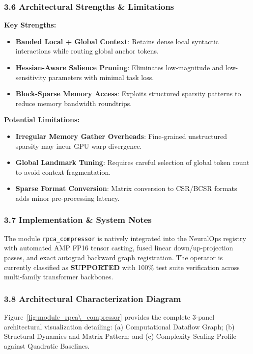 \subsubsection*{3.6 Architectural Strengths \& Limitations}
\textbf{Key Strengths:}
\begin{itemize}
    \item \textbf{Banded Local + Global Context}: Retains dense local syntactic interactions while routing global anchor tokens.
    \item \textbf{Hessian-Aware Salience Pruning}: Eliminates low-magnitude and low-sensitivity parameters with minimal task loss.
    \item \textbf{Block-Sparse Memory Access}: Exploits structured sparsity patterns to reduce memory bandwidth roundtrips.
\end{itemize}

\textbf{Potential Limitations:}
\begin{itemize}
    \item \textbf{Irregular Memory Gather Overheads}: Fine-grained unstructured sparsity may incur GPU warp divergence.
    \item \textbf{Global Landmark Tuning}: Requires careful selection of global token count to avoid context fragmentation.
    \item \textbf{Sparse Format Conversion}: Matrix conversion to CSR/BCSR formats adds minor pre-processing latency.
\end{itemize}

\subsubsection*{3.7 Implementation \& System Notes}
The module \texttt{rpca\_compressor} is natively integrated into the NeuralOps registry with automated AMP FP16 tensor casting, fused linear down/up-projection passes, and exact autograd backward graph registration. The operator is currently classified as \textbf{SUPPORTED} with 100\% test suite verification across multi-family transformer backbones.

\subsubsection*{3.8 Architectural Characterization Diagram}
Figure~\ref{fig:module_rpca\_compressor} provides the complete 3-panel architectural visualization detailing: (a) Computational Dataflow Graph; (b) Structural Dynamics and Matrix Pattern; and (c) Complexity Scaling Profile against Quadratic Baselines.

